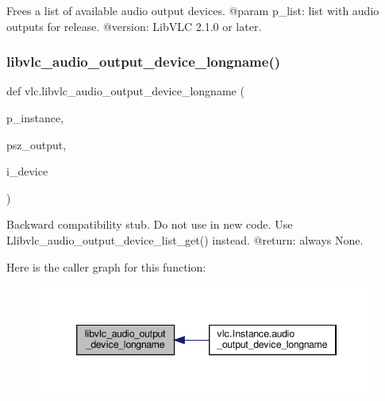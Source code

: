 \begin{DoxyVerb}Frees a list of available audio output devices.
@param p_list: list with audio outputs for release.
@version: LibVLC 2.1.0 or later.
\end{DoxyVerb}
 \mbox{\label{namespacevlc_a88c35604ea93344aaec29a2967e5ffa8}} 
\subsubsection{\texorpdfstring{libvlc\+\_\+audio\+\_\+output\+\_\+device\+\_\+longname()}{libvlc\_audio\_output\_device\_longname()}}
{\footnotesize\ttfamily def vlc.\+libvlc\+\_\+audio\+\_\+output\+\_\+device\+\_\+longname (\begin{DoxyParamCaption}\item[{}]{p\+\_\+instance,  }\item[{}]{psz\+\_\+output,  }\item[{}]{i\+\_\+device }\end{DoxyParamCaption})}

\begin{DoxyVerb}Backward compatibility stub. Do not use in new code.
\deprecated Use L{libvlc_audio_output_device_list_get}() instead.
@return: always None.
\end{DoxyVerb}
 Here is the caller graph for this function\+:
\nopagebreak
\begin{figure}[H]
\begin{center}
\leavevmode
\includegraphics[width=346pt]{namespacevlc_a88c35604ea93344aaec29a2967e5ffa8_icgraph}
\end{center}
\end{figure}
\mbox{\label{namespacevlc_a25b3f026d49515a2d0ae0906495c5fcb}} 
